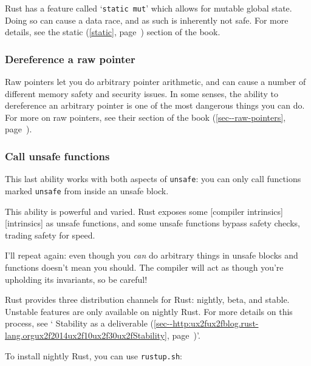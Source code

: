 \documentclass[a4paper,]{book}
\renewcommand*{\hyperref}[2][\ar]{%
  \def\ar{#2}%
  #2 (\autoref{#1}, page~\pageref{#1})}
\newenvironment{Shaded}{\begin{snugshade}}{\end{snugshade}}
\newcommand{\KeywordTok}[1]{\textcolor[rgb]{0.13,0.29,0.53}{\textbf{{#1}}}}
\newcommand{\NormalTok}[1]{{#1}}
\begin{document}
Rust has a feature called `\texttt{static\ mut}' which allows for
mutable global state. Doing so can cause a data race, and as such is
inherently not safe. For more details, see the \hyperref[static]{static}
section of the book.

\subsubsection{Dereference a raw
pointer}\label{dereference-a-raw-pointer}

Raw pointers let you do arbitrary pointer arithmetic, and can cause a
number of different memory safety and security issues. In some senses,
the ability to dereference an arbitrary pointer is one of the most
dangerous things you can do. For more on raw pointers, see
\hyperref[sec--raw-pointers]{their section of the book}.

\subsubsection{Call unsafe functions}\label{call-unsafe-functions}

This last ability works with both aspects of \texttt{unsafe}: you can
only call functions marked \texttt{unsafe} from inside an unsafe block.

This ability is powerful and varied. Rust exposes some {[}compiler
intrinsics{]}{[}intrinsics{]} as unsafe functions, and some unsafe
functions bypass safety checks, trading safety for speed.

I'll repeat again: even though you \emph{can} do arbitrary things in
unsafe blocks and functions doesn't mean you should. The compiler will
act as though you're upholding its invariants, so be careful!


Rust provides three distribution channels for Rust: nightly, beta, and
stable. Unstable features are only available on nightly Rust. For more
details on this process, see
`\hyperref[sec--http:ux2fux2fblog.rust-lang.orgux2f2014ux2f10ux2f30ux2fStability]{Stability
as a deliverable}'.

To install nightly Rust, you can use \texttt{rustup.sh}:

\begin{Shaded}
\end{Shaded}
\end{document}
